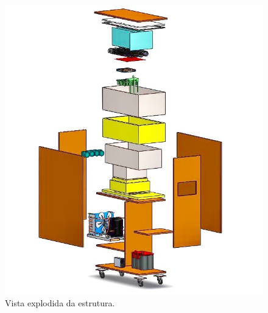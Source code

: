 \begin{apendicesenv}
\begin{figure}[H]
\centering
\includegraphics[width=\textwidth]{figuras/visao_explodida}
\caption{Vista explodida da estrutura.}
\label{fig:visao_explodida}
\end{figure}

\end{apendicesenv}
